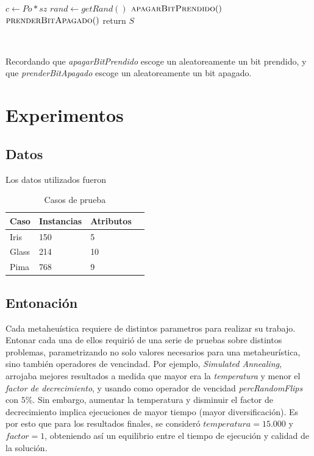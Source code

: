 \documentclass[11pt]{article}
\begin{document}
    {\fontsize{10}{10}\selectfont
    \begin{algorithmic}
        \State $c \gets Po * sz$   
                \State $rand \gets getRand()$     
                \State $\Call{apagarBitPrendido}$ 
                \Else
                \State $\Call{prenderBitApagado}$ 
                \EndIf
            \EndFor
            \State return $S$
        \EndFunction
    \end{algorithmic}
    }

    ~\ 

  Recordando que \emph{apagarBitPrendido} escoge un aleatoreamente un bit prendido,
  y  que \emph{prenderBitApagado} escoge un aleatoreamente un bit apagado.

\clearpage
\section{Experimentos}

\subsection{Datos}

Los datos utilizados fueron

\begin{table}[h]
\begin{tabular}{ |l|l|l|l| }
    \hline
    Caso    & Instancias & Atributos \\ \hline
    Iris & 150 & 5 \\ \hline
    Glass & 214 & 10 \\ \hline
    Pima & 768 & 9 \\ \hline
\end{tabular}
\caption{Casos de prueba}
\label{tabla:1}
\end{table}

\subsection{Entonación}

Cada metaheuística requiere de distintos parametros para realizar
su trabajo. Entonar cada una de ellos requirió de una serie 
de pruebas sobre distintos problemas, parametrizando
no solo valores necesarios para una metaheurística, sino también operadores de vencindad. 
Por ejemplo, \emph{Simulated Annealing}, arrojaba mejores 
resultados a medida que mayor era la \emph{temperatura} y menor el \emph{factor de decrecimiento},
y usando como operador de vencidad \emph{percRandomFlips} con $5\%$. Sin embargo,
aumentar la temperatura y disminuir el factor de decrecimiento implica ejecuciones 
de mayor tiempo (mayor
diversificación). Es por esto que para los resultados finales, se consideró $temperatura = 15.000$ 
y $factor = 1$, obteniendo así un equilibrio entre el tiempo de ejecución y calidad de la solución. 
\end{document}
